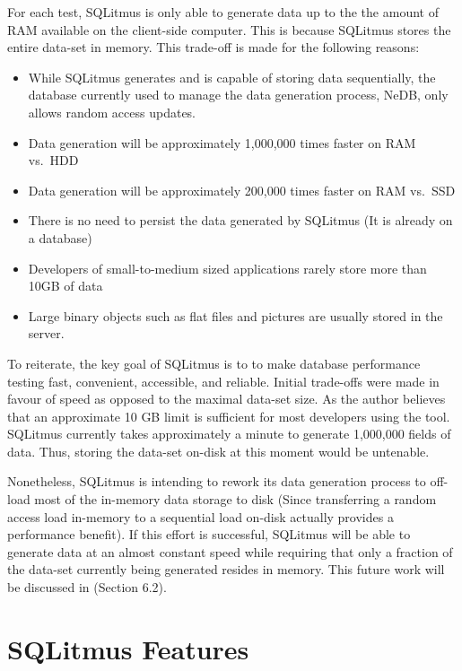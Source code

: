 \documentclass[12pt]{report}
\begin{document}
\begin{spacing}{1.9}
\begin{figure}[H]
		\end{figure}
		
		
		For each test, SQLitmus is only able to generate data up to the the amount of RAM available on the client-side computer. This is because SQLitmus stores the entire data-set in memory. This trade-off is made for the following reasons:
		\begin{itemize}
			\item While SQLitmus generates and is capable of storing data sequentially, the database currently used to manage the data generation process, NeDB, only allows random access updates. 
			\item Data generation will be approximately 1,000,000 times faster on RAM vs.\ HDD
			\item Data generation will be approximately 200,000 times faster on RAM vs.\ SSD
			\item There is no need to persist the data generated by SQLitmus (It is already on a database)
			\item Developers of small-to-medium sized applications rarely store more than 10GB of data
			\item Large binary objects such as flat files and pictures are usually stored in the server.
		\end{itemize}
		
		
		To reiterate, the key goal of SQLitmus is to to make database performance testing fast, convenient, accessible, and reliable. Initial trade-offs were made in favour of speed as opposed to the maximal data-set size. As the author believes that an approximate 10 GB limit is sufficient for most developers using the tool. SQLitmus currently takes approximately a minute to generate 1,000,000 fields of data. Thus, storing the data-set on-disk at this moment would be untenable.
		
		Nonetheless, SQLitmus is intending to rework its data generation process to off-load most of the in-memory data storage to disk (Since transferring a random access load in-memory to a sequential load on-disk actually provides a performance benefit). If this effort is successful, SQLitmus will be able to generate data at an almost constant speed while requiring that only a fraction of the data-set currently being generated resides in memory. This future work will be discussed in (Section 6.2).
		
		
		\chapter{SQLitmus Features}
		

\end{spacing}
\end{document}
